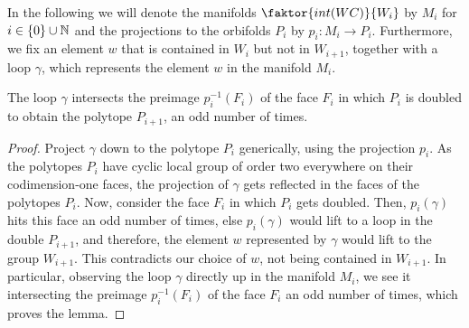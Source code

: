 In the following we will denote the manifolds \(\faktor{int(WC)}{W_i}\) by \(M_i\) for \(i \in \{0\} \cup \mathbb{N}\) and the projections to the orbifolds \(P_i\) by \(p_i : M_i \to P_i\).
Furthermore, we fix an element \(w\) that is contained in \(W_i\) but not in \(W_{i+1}\), together with a loop \(\gamma\), which represents the element \(w\) in the manifold \(M_i\).

\begin{lemma}
    The loop \(\gamma\) intersects the preimage \(p_i^{-1}(F_i)\) of the face \(F_i\) in which \(P_i\) is doubled to obtain the polytope \(P_{i+1}\), an odd number of times.
\end{lemma}
\begin{proof}
    Project \(\gamma\) down to the polytope \(P_i\) generically, using the projection \(p_i\).
    As the polytopes \(P_i\) have cyclic local group of order two everywhere on their codimension-one faces, the projection of \(\gamma\) gets reflected in the faces of the polytopes \(P_i\).
    Now, consider the face \(F_i\) in which \(P_i\) gets doubled.
    Then, \(p_i(\gamma)\) hits this face an odd number of times, else \(p_i(\gamma)\) would lift to a loop in the double \(P_{i+1}\), and therefore, the element \(w\) represented by \(\gamma\) would lift to the group \(W_{i+1}\).
    This contradicts our choice of \(w\), not being contained in \(W_{i+1}\).
    In particular, observing the loop \(\gamma\) directly up in the manifold \(M_i\), we see it intersecting the preimage \(p_i^{-1}(F_i)\) of the face \(F_i\) an odd number of times, which proves the lemma.
\end{proof}



